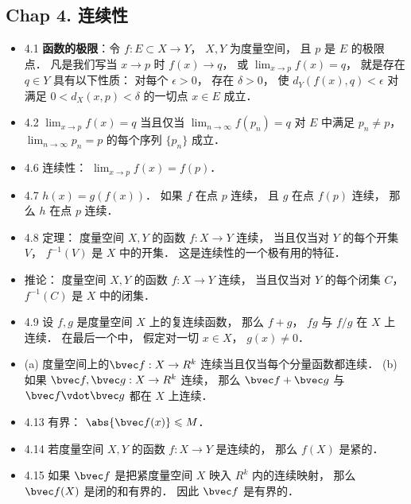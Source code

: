 
\subsection{Chap 4. 连续性}

\begin{itemize}
\item 4.1 \textbf{函数的极限}：令 $f:E\subset X\to Y$， $X,Y$ 为度量空间， 且 $p$ 是 $E$ 的极限点． 凡是我们写当 $x\to p$ 时 $f(x)\to q$， 或 $\lim_{x\to p}f(x)=q$， 就是存在 $q\in Y$ 具有以下性质： 对每个 $\epsilon>0$， 存在 $\delta>0$， 使 $d_{Y}(f(x),q)<\epsilon$ 对满足 $0<d_X(x,p)<\delta$ 的一切点 $x\in E$ 成立．

\item 4.2 $\lim_{x\to p}f(x)=q$ 当且仅当 $\lim_{n\to\infty} f(p_n)=q$ 对 $E$ 中满足 $p_n\ne p$， $\lim_{n\to\infty} p_n=p$ 的每个序列 $\{p_n\}$ 成立．

\item 4.6 连续性： $\lim_{x\to p}f(x)=f(p)$．

\item 4.7 $h(x) = g(f(x))$． 如果 $f$ 在点 $p$ 连续， 且 $g$ 在点 $f(p)$ 连续， 那么 $h$ 在点 $p$ 连续．

\item 4.8 定理： 度量空间 $X,Y$ 的函数 $f:X\to Y$ 连续， 当且仅当对 $Y$ 的每个开集 $V$， $f^{-1}(V)$ 是 $X$ 中的开集． 这是连续性的一个极有用的特征．

\item 推论： 度量空间 $X,Y$ 的函数 $f:X\to Y$ 连续， 当且仅当对 $Y$ 的每个闭集 $C$， $f^{-1}(C)$ 是 $X$ 中的闭集．

\item 4.9 设 $f,g$ 是度量空间 $X$ 上的复连续函数， 那么 $f+g$， $fg$ 与 $f/g$ 在 $X$ 上连续． 在最后一个中， 假定对一切 $x\in X$， $g(x)\ne 0$．

\item (a) 度量空间上的$\bvec f:X\to R^k$ 连续当且仅当每个分量函数都连续． (b) 如果 $\bvec f, \bvec g:X\to R^k$ 连续， 那么 $\bvec f+\bvec g$ 与 $\bvec f\vdot \bvec g$ 都在 $X$ 上连续．

\item 4.13 有界： $\abs{\bvec f(x)}\leqslant M$．

\item 4.14 若度量空间 $X,Y$ 的函数 $f:X\to Y$ 是连续的， 那么 $f(X)$ 是紧的．

\item 4.15 如果 $\bvec f$ 是把紧度量空间 $X$ 映入 $R^k$ 内的连续映射， 那么 $\bvec f(X)$ 是闭的和有界的． 因此 $\bvec f$ 是有界的．


\end{itemize}
